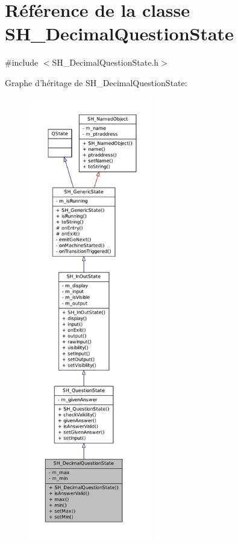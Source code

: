 \hypertarget{classSH__DecimalQuestionState}{\section{Référence de la classe S\-H\-\_\-\-Decimal\-Question\-State}
\label{classSH__DecimalQuestionState}
}


{\ttfamily \#include $<$S\-H\-\_\-\-Decimal\-Question\-State.\-h$>$}



Graphe d'héritage de S\-H\-\_\-\-Decimal\-Question\-State\-:
\nopagebreak
\begin{figure}[H]
\begin{center}
\leavevmode
\includegraphics[height=550pt]{classSH__DecimalQuestionState__inherit__graph}
\end{center}
\end{figure}


